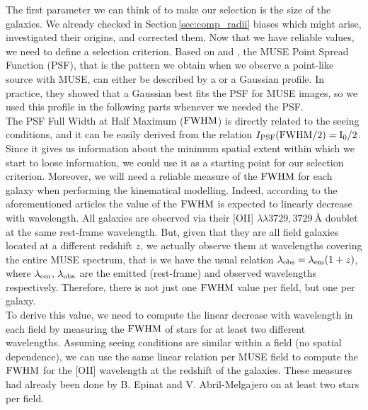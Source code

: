The first parameter we can think of to make our selection is the size of the galaxies. We already checked in Section\,\ref{sec:comp_radii} biases which might arise, investigated their origins, and corrected them. Now that we have reliable values, we need to define a selection criterion. Based on  and , the MUSE Point Spread Function (PSF), that is the pattern we obtain when we observe a point-like source with MUSE, can either be described by   a  or a Gaussian profile. In practice, they showed that a Gaussian best fits the PSF for MUSE images, so we used this profile in the following parts whenever we needed the PSF. \\

The PSF Full Width at Half Maximum ($\rm{FWHM}$) is directly related to the seeing conditions, and it can be easily derived from the relation $I_{\rm{PSF}} ( \rm{FWHM}/2) = I_0 /2$. Since it gives us information about the minimum spatial extent within which we start to loose information, we could use it as a starting point for our selection criterion. Moreover, we will need a reliable measure of the $\rm{FWHM}$ for each galaxy when performing the kinematical modelling. Indeed, according to the aforementioned articles the value of the $\rm{FWHM}$ is expected to linearly decrease with wavelength. All galaxies are observed via their [OII] $\lambda\lambda 3729, \SI{3729}{\angstrom}$ doublet at the same rest-frame wavelength. But, given that they are all field galaxies located at a different redshift $z$, we actually observe them at wavelengths covering the entire MUSE spectrum, that is we have the usual relation $\lambda_{\rm{obs}} = \lambda_{\rm{em}} ( 1 + z )$, where $\lambda_{\rm{em}}$, $\lambda_{\rm{obs}}$ are the emitted (rest-frame) and observed wavelengths respectively. Therefore, there is not just one $\rm{FWHM}$ value per field, but one per galaxy. \\

To derive this value, we need to compute the linear decrease with wavelength in each field by measuring the $\rm{FWHM}$ of stars for at least two different wavelengths. Assuming seeing conditions are similar within a field (no spatial dependence), we can use the same linear relation per MUSE field to compute the $\rm{FWHM}$ for the [OII] wavelength at the redshift of the galaxies. These measures had already been done by B. Epinat and V. Abril-Melgajero on at least two stars per field. \\

